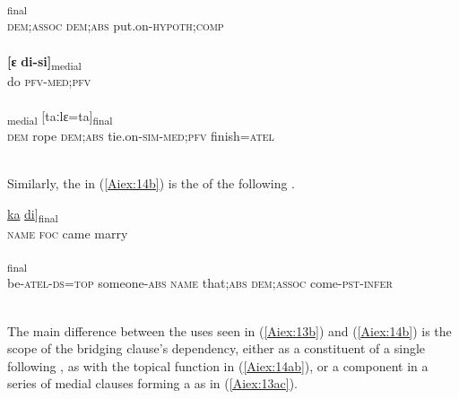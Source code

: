 \documentclass[output=paper]{LSP/langsci}
\begin{document}
\begin{exe}
\ex \label{Aiex:13ac}
\begin{xlist}
\ex \label{Aiex:13a}
\gll \underline{\smash{[aːmi}}	\underline{}	\underline{\smash{bɛː-ɸɛi]}}\textsubscript{final}\\
\textsc{dem;assoc}	\textsc{dem;abs}	put.on-\textsc{hypoth;comp}\\
\glt {}\\
\ex \label{Aiex:13b}
\gll \textbf{[ɛ}	\textbf{di-si]}\textsubscript{medial}\\
	do	\textsc{pfv-med;pfv}\\
\glt {}\\
\ex \label{Aiex:13c}
\textsubscript{medial}	[taːlɛ=ta]\textsubscript{final}\\
	\textsc{dem}	rope	\textsc{dem;abs}	tie.on-\textsc{sim-med;pfv}	finish=\textsc{atel}\\
\glt {}\\
\end{xlist}
\end{exe}

Similarly, the  in (\ref{Aiex:14b}) is the  of the following . 

\begin{exe}
\ex \label{Aiex:14ab}
\begin{xlist}
\ex \label{Aiex:14a}
\gll \underline{\smash{[usaja}}	\underline{ka}	\underline{}	\underline{di}]\textsubscript{final}\\
	\textsc{name}	\textsc{foc}	came	marry\\
\glt	{}\\
\ex \label{Aiex:14b}
\textsubscript{final}\\
	be-\textsc{atel-ds=top}	someone-\textsc{abs}	\textsc{name}	that\textsc{;abs}	\textsc{dem;assoc}	come\textsc{-pst-infer}\\
\glt {}\\
\end{xlist}
\end{exe}

The main difference between the uses seen in (\ref{Aiex:13b}) and (\ref{Aiex:14b}) is the scope of the bridging clause’s dependency, either as a constituent of a single following , as with the topical function in (\ref{Aiex:14ab}), or a component in a series of medial clauses forming a  as in (\ref{Aiex:13ac}).
\end{document}
